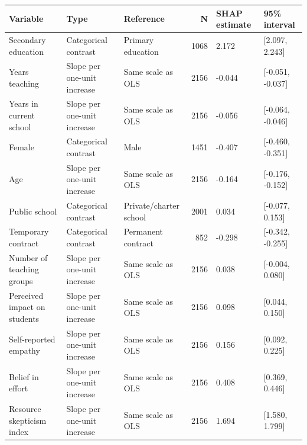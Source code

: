 \begin{tabular}{lllrll}
\toprule
Variable & Type & Reference & N & SHAP estimate & 95\% interval\\
\midrule
Secondary education & Categorical contrast & Primary education & 1068 & 2.172 & {}[2.097, 2.243]\\
Years teaching & Slope per one-unit increase & Same scale as OLS & 2156 & -0.044 & {}[-0.051, -0.037]\\
Years in current school & Slope per one-unit increase & Same scale as OLS & 2156 & -0.056 & {}[-0.064, -0.046]\\
Female & Categorical contrast & Male & 1451 & -0.407 & {}[-0.460, -0.351]\\
Age & Slope per one-unit increase & Same scale as OLS & 2156 & -0.164 & {}[-0.176, -0.152]\\
\addlinespace
Public school & Categorical contrast & Private/charter school & 2001 & 0.034 & {}[-0.077, 0.153]\\
Temporary contract & Categorical contrast & Permanent contract & 852 & -0.298 & {}[-0.342, -0.255]\\
Number of teaching groups & Slope per one-unit increase & Same scale as OLS & 2156 & 0.038 & {}[-0.004, 0.080]\\
Perceived impact on students & Slope per one-unit increase & Same scale as OLS & 2156 & 0.098 & {}[0.044, 0.150]\\
Self-reported empathy & Slope per one-unit increase & Same scale as OLS & 2156 & 0.156 & {}[0.092, 0.225]\\
\addlinespace
Belief in effort & Slope per one-unit increase & Same scale as OLS & 2156 & 0.408 & {}[0.369, 0.446]\\
Resource skepticism index & Slope per one-unit increase & Same scale as OLS & 2156 & 1.694 & {}[1.580, 1.799]\\
\bottomrule
\end{tabular}
